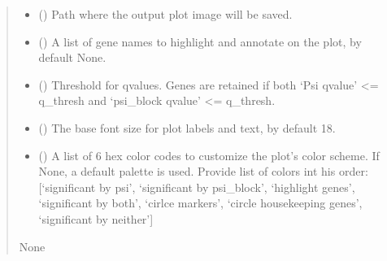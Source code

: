 \documentclass[letterpaper,10pt,english]{sphinxmanual}
\begin{document}
\begin{fulllineitems}
\begin{quote}
\begin{description}
\begin{itemize}
\item {} 
\sphinxAtStartPar
{} (\sphinxstyleliteralemphasis{\sphinxupquote{, }}) \textendash{} Path where the output plot image will be saved.

\item {} 
\sphinxAtStartPar
{} (\sphinxstyleliteralemphasis{\sphinxupquote{{[}}}\sphinxstyleliteralemphasis{\sphinxupquote{{]}}}\sphinxstyleliteralemphasis{\sphinxupquote{, }}) \textendash{} A list of gene names to highlight and annotate on the plot, by default None.

\item {} 
\sphinxAtStartPar
{} (\sphinxstyleliteralemphasis{\sphinxupquote{, }}\sphinxstyleliteralemphasis{\sphinxupquote{, }}) \textendash{} Threshold for q\sphinxhyphen{}values. Genes are retained if both
‘Psi q\sphinxhyphen{}value’ \textless{}= q\_thresh and ‘psi\_block q\sphinxhyphen{}value’ \textless{}= q\_thresh.

\item {} 
\sphinxAtStartPar
{} (\sphinxstyleliteralemphasis{\sphinxupquote{, }}) \textendash{} The base font size for plot labels and text, by default 18.

\item {} 
\sphinxAtStartPar
{} (\sphinxstyleliteralemphasis{\sphinxupquote{{[}}}\sphinxstyleliteralemphasis{\sphinxupquote{{]}}}\sphinxstyleliteralemphasis{\sphinxupquote{, }}) \textendash{} A list of 6 hex color codes to customize the plot’s color scheme.
If None, a default palette is used.
Provide list of colors int his order:
{[}‘significant by psi’,
‘significant by psi\_block’,
‘highlight genes’,
‘significant by both’,
‘cirlce markers’,
‘circle housekeeping genes’,
‘significant by neither’{]}

\end{itemize}

\sphinxAtStartPar
None

\end{description}\end{quote}

\end{fulllineitems}
\end{document}
